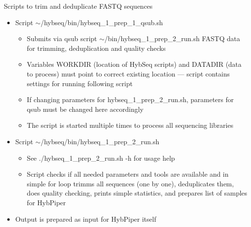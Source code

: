\documentclass[compress,  xelatex, 11pt, xcolor=x11names, aspectratio=169,
	hyperref={
		bookmarks=true,
		unicode=true,
		colorlinks=true,
		pdftitle={HybSeq course},
		plainpages=false,
		pdfauthor={Vojtech Zeisek},
		pdfsubject={Practical processing of HybSeq target enrichment sequencing data on computing grids like MetaCentrum},
		pdfcreator={XeLaTeX},
		pdfkeywords={BASH, command line, GNU, HybSeq, Linux, MetaCentrum, sequencing shell, target enrichment},
		linkcolor=Turquoise4, %
		anchorcolor=DodgerBlue4, %
		citecolor=DodgerBlue4, %
		filecolor=DodgerBlue4, %
		menucolor=Tan4, %
		urlcolor=DarkOliveGreen4 %
		},
	url={hyphens, lowtilde} %
	]{beamer}
\renewcommand{\texttt}[1]{\colorbox{Cornsilk2}{{\ttfamily #1}}}
\begin{document}
\begin{frame}{Scripts to trim and deduplicate FASTQ sequences}
	\begin{itemize}
		\item Script \texttt{$\sim$/hybseq/bin/hybseq\_1\_prep\_1\_qsub.sh}
		\begin{itemize}
			\item Submits via \texttt{qsub} script \texttt{$\sim$/bin/hybseq\_1\_prep\_2\_run.sh} FASTQ data for trimming, deduplication and quality checks
			\item Variables \texttt{WORKDIR} (location of HybSeq scripts) and \texttt{DATADIR} (data to process) must point to correct existing location --- script contains settings for running following script
			\item If changing parameters for \texttt{hybseq\_1\_prep\_2\_run.sh}, parameters for \texttt{qsub} must be changed here accordingly
			\item The script is started multiple times to process all sequencing libraries
		\end{itemize}
		\item Script \texttt{$\sim$/hybseq/bin/hybseq\_1\_prep\_2\_run.sh}
		\begin{itemize}
			\item See \texttt{./hybseq\_1\_prep\_2\_run.sh -h} for usage help
			\item Script checks if all needed parameters and tools are available and in simple \texttt{for} loop trimms all sequences (one by one), deduplicates them, does quality checking, prints simple statistics, and prepares list of samples for HybPiper
		\end{itemize}
		\item Output is prepared as input for HybPiper itself
	\end{itemize}
\end{frame}
\end{document}
